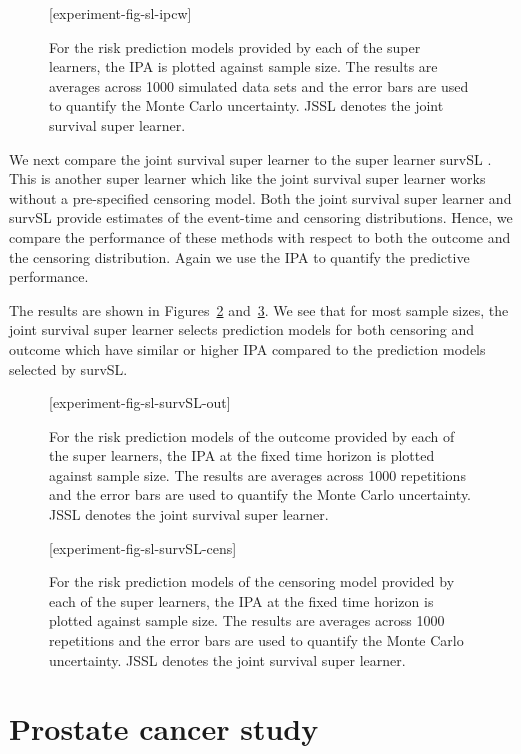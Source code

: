 \documentclass[lineno]{biometrika}
\newcommand{\1}{\mathds{1}}
\begin{document}
\begin{figure}
\figurebox{20pc}{25pc}{}[experiment-fig-sl-ipcw]
\caption{For the risk prediction models provided by each of the
    super learners, the IPA is plotted against sample size. The
    results are averages across 1000 simulated data sets and the error
    bars are used to quantify the Monte Carlo uncertainty. JSSL
    denotes the joint survival super learner. }
\label{fig:ipcw-fail}
\end{figure}

We next compare the joint survival super learner to the super learner
survSL \citep{westling2021inference}. This is another super learner
which like the joint survival super learner works without a
pre-specified censoring model. Both the joint survival super learner
and survSL provide estimates of the event-time and censoring
distributions. Hence, we compare the performance of these methods with
respect to both the outcome and the censoring distribution. Again we
use the IPA to quantify the predictive performance.

The results are shown in Figures~\ref{fig:zelefski-out}
and~\ref{fig:zelefski-cens}. We see that for most sample sizes, the
joint survival super learner selects prediction models for both
censoring and outcome which have similar or higher IPA compared to the
prediction models selected by survSL.
\begin{figure}
\figurebox{20pc}{25pc}{}[experiment-fig-sl-survSL-out]
\caption{For the risk prediction models of the outcome provided by
  each of the super learners, the IPA at the fixed time horizon is
  plotted against sample size. The results are averages across 1000
  repetitions and the error bars are used to quantify the Monte Carlo
  uncertainty. JSSL denotes the joint survival super learner.}
\label{fig:zelefski-out}
\end{figure}

\begin{figure}
\figurebox{20pc}{25pc}{}[experiment-fig-sl-survSL-cens]
\caption{For the risk prediction models of the censoring model
    provided by each of the super learners, the IPA at the fixed time
    horizon is plotted against sample size. The results are averages
    across 1000 repetitions and the error bars are used to quantify
    the Monte Carlo uncertainty. JSSL denotes the joint survival super
    learner.}
\label{fig:zelefski-cens}
\end{figure}


\section{Prostate cancer study}
\label{sec:real-data-appl}
\end{document}
